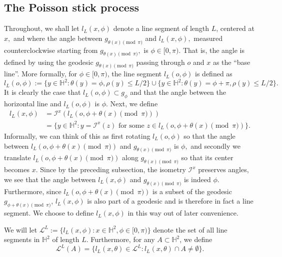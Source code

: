 \documentclass[a4paper,12pt]{article}
\newcommand{\BH}{{\mathbb{H}}}
\newcommand{\CI}{{\mathcal{I}}}
\newcommand{\CL}{{\mathcal{L}}}
\begin{document}
\subsection{The Poisson stick process} \label{sec:Poistick}
Throughout, we shall let $l_L(x,\phi)$ denote a line segment of length $L$,
centered at $x,$ and where the angle between $g_{\theta(x) \pmod \pi}$ and
$l_L(x,\phi),$ measured counterclockwise starting from $g_{\theta(x) \pmod \pi},$ 
is $\phi\in[0,\pi).$ 
That is, the angle is defined by using the geodesic 
$g_{\theta(x) \pmod \pi}$ passing through $o$ and $x$ as the ``base line''.
More formally, for $\phi\in[0,\pi)$, the line segment $l_L(o,\phi)$ is defined as 
\[
l_L(o,\phi):=\{y\in \BH^2: \theta(y)=\phi, \rho(y)\leq L/2\}
\cup 
\{y\in \BH^2: \theta(y)=\phi+\pi, \rho(y)\leq L/2\}.
\]
It is clearly the case that $l_L(o,\phi) \subset g_\phi$ and that the angle between 
the horizontal line and $l_L(o,\phi)$ is $\phi.$
Next, we define 
\begin{align*}
l_L(x,\phi)& =\CI^x\left(l_L(o,\phi+\theta(x) \pmod \pi)\right) \\
& =\{y\in \BH^2:y=\CI^x(z) \textrm{ for some } z\in l_L(o,\phi+\theta(x) \pmod \pi)\}.
\end{align*}
Informally, we can think of this as first rotating $l_L(o,\phi)$ so that the angle between 
$l_L(o,\phi+\theta(x) \pmod \pi)$ and $g_{\theta(x) \pmod \pi}$ is $\phi,$ and secondly 
we translate $l_L(o,\phi+\theta(x) \pmod \pi)$ along $g_{\theta(x) \pmod \pi}$ so that its 
center becomes $x$. Since by the preceding subsection, the isometry $\CI^x$ 
preserves angles, we see that the angle between $l_L(x,\phi)$ and $g_{\theta(x) \pmod \pi}$
is indeed $\phi.$
Furthermore, since $l_L(o,\phi+\theta(x) \pmod \pi)$ is a subset of the geodesic 
$g_{\phi+\theta(x) \pmod \pi}$, $l_L(x,\phi)$ is also part of a geodesic and 
is therefore in fact a line segment. 
We choose to define 
$l_L(x,\phi)$ in this way out of later convenience.

We will let $\CL^L:=\{l_L(x,\phi): x\in \BH^2, \phi\in[0,\pi)\}$ denote the 
set of all 
line segments in $\BH^2$ of length $L.$ Furthermore, for any $A \subset \BH^2$, we define  
\begin{equation} \label{eqn:defCLA}
\CL^L(A)=\{l_L(x,\theta)\in \CL^L: l_L(x,\theta)\cap A \neq \emptyset\}.    
\end{equation}
\end{document}
